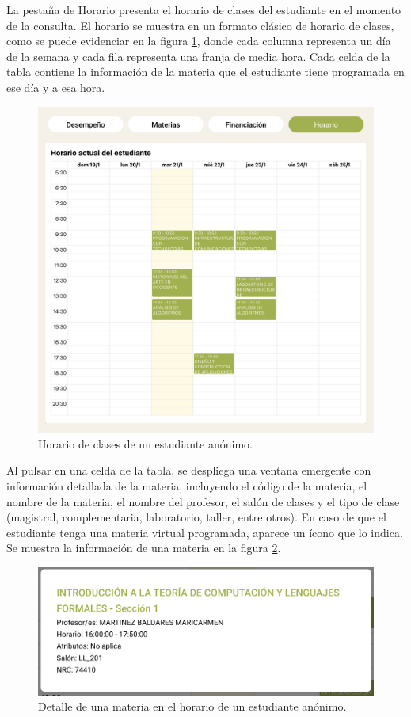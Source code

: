 La pestaña de Horario presenta el horario de clases del estudiante en el momento de la consulta. El horario se muestra en un formato clásico de horario de clases, como se puede evidenciar en la figura \ref{fig:horario}, donde cada columna representa un día de la semana y cada fila representa una franja de media hora. Cada celda de la tabla contiene la información de la materia que el estudiante tiene programada en ese día y a esa hora.

\begin{figure}[H]
	\centering
	\includegraphics[width=\textwidth]{assets/nes/horario.png}
	\caption{Horario de clases de un estudiante anónimo.}
	\label{fig:horario}
\end{figure}

Al pulsar en una celda de la tabla, se despliega una ventana emergente con información detallada de la materia, incluyendo el código de la materia, el nombre de la materia, el nombre del profesor, el salón de clases y el tipo de clase (magistral, complementaria, laboratorio, taller, entre otros). En caso de que el estudiante tenga una materia virtual programada, aparece un ícono que lo indica. Se muestra la información de una materia en la figura \ref{fig:detalle_horario}.

\begin{figure}[H]
	\centering
	\includegraphics[width=\textwidth]{assets/nes/detalle_horario.png}
	\caption{Detalle de una materia en el horario de un estudiante anónimo.}
	\label{fig:detalle_horario}
\end{figure}

